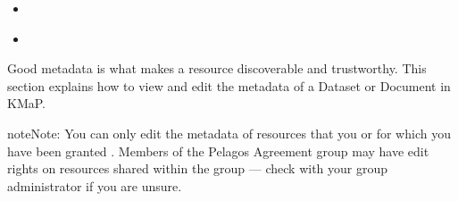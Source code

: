 \documentclass[letterpaper,10pt,english]{sphinxmanual}
\begin{document}
\begin{sphinxcontents}
\begin{itemize}
\begin{itemize}
\item {} 
\sphinxAtStartPar
{}\label{\detokenize{en/03_managing_metadata:id9}}{\hyperref[\detokenize{en/03_managing_metadata:spatial-extent}]{}}

\item {} 
\sphinxAtStartPar
{}\label{\detokenize{en/03_managing_metadata:id10}}{\hyperref[\detokenize{en/03_managing_metadata:date-fields}]{}}

\item {} 
\sphinxAtStartPar
{}\label{\detokenize{en/03_managing_metadata:id11}}{\hyperref[\detokenize{en/03_managing_metadata:licence}]{}}

\item {} 
\sphinxAtStartPar
{}\label{\detokenize{en/03_managing_metadata:id12}}{\hyperref[\detokenize{en/03_managing_metadata:point-of-contact}]{}}

\item {} 
\sphinxAtStartPar
{}\label{\detokenize{en/03_managing_metadata:id13}}{\hyperref[\detokenize{en/03_managing_metadata:thumbnail}]{}}

\end{itemize}

\item {} 
\sphinxAtStartPar
{}\label{\detokenize{en/03_managing_metadata:id14}}{\hyperref[\detokenize{en/03_managing_metadata:saving-your-changes}]{}}

\item {} 
\sphinxAtStartPar
{}\label{\detokenize{en/03_managing_metadata:id15}}{\hyperref[\detokenize{en/03_managing_metadata:metadata-completeness-checklist}]{}}

\end{itemize}
\end{sphinxcontents}

\sphinxAtStartPar
Good metadata is what makes a resource discoverable and trustworthy. This section
explains how to view and edit the metadata of a Dataset or Document in KMaP.

\begin{sphinxadmonition}{note}{Note:}
\sphinxAtStartPar
You can only edit the metadata of resources that you  or for which you have
been granted . Members of the Pelagos Agreement group may have
edit rights on resources shared within the group — check with your group administrator
if you are unsure.
\end{sphinxadmonition}
\end{document}
